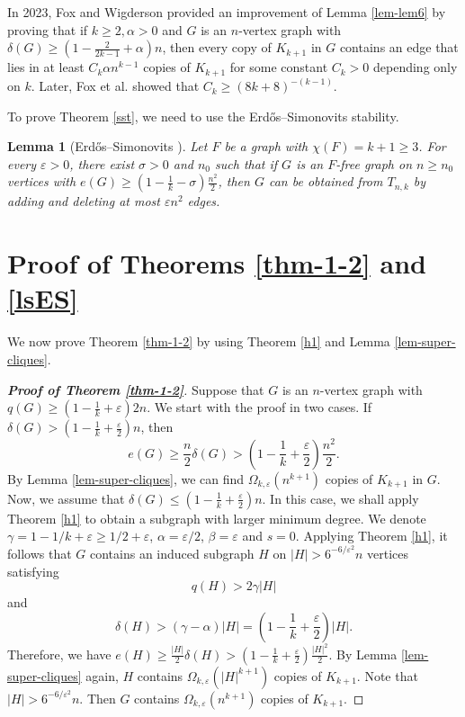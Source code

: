\documentclass[11pt,a4paper]{article}
\theoremstyle{plain}
\newtheorem{lem}[theorem]{Lemma}
\theoremstyle{definition}
\begin{document}
{In 2023, Fox and Wigderson \cite[Lemma 2.3]{FW2023} provided an improvement of Lemma \ref{lem-lem6} by proving that 
if $k\ge 2, \alpha >0$ and $G$ is an $n$-vertex graph with $ \delta (G) \ge (1- \frac{2}{2k-1} + \alpha )n$, 
then every copy of $K_{k+1}$ in $G$ 
contains an edge that lies in at least $C_k \alpha n^{k-1}$ copies of $K_{k+1}$ 
for some constant $C_k>0$ depending only on $k$. Later, Fox et al. \cite[Lemma A.1]{FHW2021} showed that $C_k\ge (8k+8)^{-(k-1)}$. 


To prove Theorem \ref{sst}, we need to use the 
Erd\H{o}s--Simonovits stability. 

\begin{lem}[Erd\H{o}s--Simonovits \cite{Erd1966Sta1,Erd1966Sta2,S1968}]\label{est}
Let $F$ be a graph with $\chi(F)=k+1\geq3$. For every $\varepsilon>0$, there exist $\sigma>0$ and $n_{0}$ such that
if $G$ is an $F$-free graph on $n\geq n_{0}$ vertices with $e(G)\geq(1- \frac{1}{k} -\sigma)\frac{n^{2}}{2}$, then $G$ can be obtained from $T_{n,k}$ by adding and deleting at most $\varepsilon n^{2}$ edges.
\end{lem}
}

\section{Proof of Theorems \ref{thm-1-2} and \ref{lsES}} 

\label{sec-4}

 


We now prove Theorem \ref{thm-1-2} by using Theorem \ref{h1} and Lemma \ref{lem-super-cliques}. 
  
\begin{proof}[{\bf Proof of Theorem \ref{thm-1-2}}]
Suppose that $G$ is an $n$-vertex graph with 
{$q(G)\ge (1- \frac{1}{k}+ {\varepsilon})2n$}. 
We start with the proof in two cases. 
    If $\delta (G) > (1- \frac{1}{k}+ \frac{\varepsilon}{2})n$, 
    then 
    \[ e(G)\geq \frac{n}{2}\delta(G)> 
\left(1-\frac{1}{k}+\frac{\varepsilon}{2} \right) \frac{n^2}{2}. \]  
By Lemma \ref{lem-super-cliques}, 
we can find $\Omega_{k,\varepsilon}(n^{k+1})$ copies of $K_{k+1}$ in $G$.  
Now, we assume that $\delta(G)\leq (1 - \frac{1}{k} + \frac{\varepsilon}{2})n$.  In this case, we shall apply 
Theorem \ref{h1} to obtain a subgraph with larger minimum degree. 
We denote $\gamma=1-1/k + \varepsilon \geq 1/2+ \varepsilon$, 
$\alpha= \varepsilon /2$, $\beta= \varepsilon $ and $s=0$. Applying Theorem \ref{h1}, it follows that $G$ contains an induced subgraph $H$ on $|H|>6^{-6/\varepsilon^{2}} n$ vertices satisfying
\[ q(H)>2\gamma |H| \] 
and 
\[ \delta(H)>(\gamma-\alpha)|H|= 
\left(1-\frac{1}{k}+\frac{\varepsilon}{2} \right)|H|. \]  
Therefore, we have $e(H) \geq \frac{|H|}{2}\delta(H)> (1-\frac{1}{k}+\frac{\varepsilon}{2} )\frac{|H|^{2}}{2}$. 
By Lemma \ref{lem-super-cliques} again, $H$ contains $\Omega_{k,\varepsilon} (|H|^{k+1})$ copies of $K_{k+1}$. 
Note that $|H|> 6^{-6/\varepsilon^{2}} n$. Then $G$ contains $\Omega_{k,\varepsilon}(n^{k+1})$ copies of $K_{k+1}$. 
\end{proof}
\end{document}
